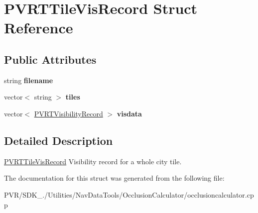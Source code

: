 \hypertarget{struct_p_v_r_t_tile_vis_record}{\section{P\+V\+R\+T\+Tile\+Vis\+Record Struct Reference}
\label{struct_p_v_r_t_tile_vis_record}
}
\subsection*{Public Attributes}
\begin{DoxyCompactItemize}
\item 
\hypertarget{struct_p_v_r_t_tile_vis_record_a93b7eed9465abc3b582952abc4175e7f}{string {\bfseries filename}}\label{struct_p_v_r_t_tile_vis_record_a93b7eed9465abc3b582952abc4175e7f}

\item 
\hypertarget{struct_p_v_r_t_tile_vis_record_ab09e5ab9a6fa3c15d9dd8318658523bb}{vector$<$ string $>$ {\bfseries tiles}}\label{struct_p_v_r_t_tile_vis_record_ab09e5ab9a6fa3c15d9dd8318658523bb}

\item 
\hypertarget{struct_p_v_r_t_tile_vis_record_a3f382375cf45b77abc68b9b302a420e7}{vector$<$ \hyperlink{struct_p_v_r_t_visibility_record}{P\+V\+R\+T\+Visibility\+Record} $>$ {\bfseries visdata}}\label{struct_p_v_r_t_tile_vis_record_a3f382375cf45b77abc68b9b302a420e7}

\end{DoxyCompactItemize}


\subsection{Detailed Description}


  \hyperlink{struct_p_v_r_t_tile_vis_record}{P\+V\+R\+T\+Tile\+Vis\+Record}  Visibility record for a whole city tile. 

The documentation for this struct was generated from the following file\+:\begin{DoxyCompactItemize}
\item 
P\+V\+R/\+S\+D\+K\+\_./\+Utilities/\+Nav\+Data\+Tools/\+Occlusion\+Calculator/occlusioncalculator.\+cpp\end{DoxyCompactItemize}
